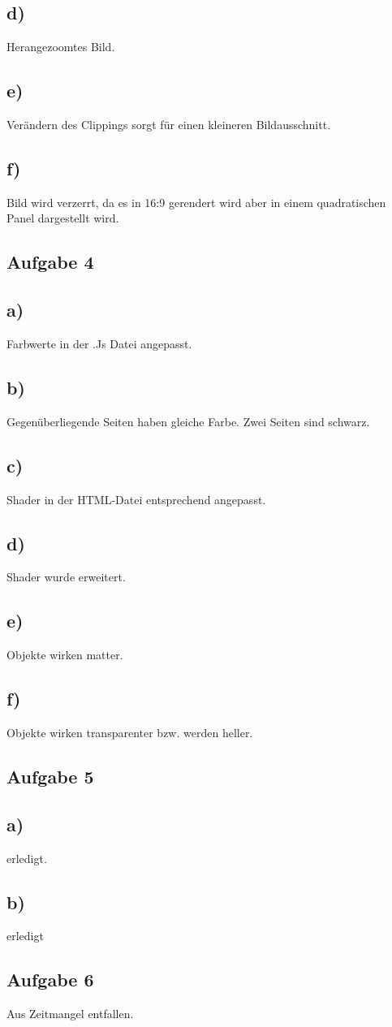 \documentclass{article}
\begin{document}
	\subsection*{d)}
	Herangezoomtes Bild.
	\subsection*{e)}
	Verändern des Clippings sorgt für einen kleineren Bildausschnitt.
	\subsection*{f)}
	Bild wird verzerrt, da es in 16:9 gerendert wird aber in einem quadratischen Panel dargestellt wird.
	\subsection*{Aufgabe 4}
	\subsection*{a)}
	Farbwerte in der .Js Datei angepasst.
	\subsection*{b)}
	Gegenüberliegende Seiten haben gleiche Farbe. Zwei Seiten sind schwarz.
	\subsection*{c)}
	Shader in der HTML-Datei entsprechend angepasst.
	\subsection*{d)}
	Shader wurde erweitert.
	\subsection*{e)}
	Objekte wirken matter. 
	\subsection*{f)}
	Objekte wirken transparenter bzw. werden heller.
	\subsection*{Aufgabe 5}
	\subsection*{a)}
	erledigt.
	\subsection*{b)}
	erledigt
	\subsection*{Aufgabe 6}
	Aus Zeitmangel entfallen.
\end{document}
